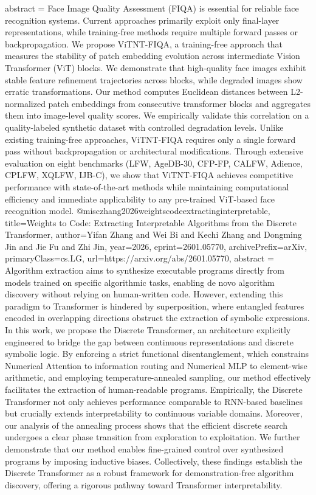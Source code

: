 {      abstract = {Face Image Quality Assessment (FIQA) is essential for reliable face recognition systems. Current approaches primarily exploit only final-layer representations, while training-free methods require multiple forward passes or backpropagation. We propose ViTNT-FIQA, a training-free approach that measures the stability of patch embedding evolution across intermediate Vision Transformer (ViT) blocks. We demonstrate that high-quality face images exhibit stable feature refinement trajectories across blocks, while degraded images show erratic transformations. Our method computes Euclidean distances between L2-normalized patch embeddings from consecutive transformer blocks and aggregates them into image-level quality scores. We empirically validate this correlation on a quality-labeled synthetic dataset with controlled degradation levels. Unlike existing training-free approaches, ViTNT-FIQA requires only a single forward pass without backpropagation or architectural modifications. Through extensive evaluation on eight benchmarks (LFW, AgeDB-30, CFP-FP, CALFW, Adience, CPLFW, XQLFW, IJB-C), we show that ViTNT-FIQA achieves competitive performance with state-of-the-art methods while maintaining computational efficiency and immediate applicability to any pre-trained ViT-based face recognition model.}
}@misc{zhang2026weightscodeextractinginterpretable,
      title={Weights to Code: Extracting Interpretable Algorithms from the Discrete Transformer}, 
      author={Yifan Zhang and Wei Bi and Kechi Zhang and Dongming Jin and Jie Fu and Zhi Jin},
      year={2026},
      eprint={2601.05770},
      archivePrefix={arXiv},
      primaryClass={cs.LG},
      url={https://arxiv.org/abs/2601.05770},
      abstract = {Algorithm extraction aims to synthesize executable programs directly from models trained on specific algorithmic tasks, enabling de novo algorithm discovery without relying on human-written code. However, extending this paradigm to Transformer is hindered by superposition, where entangled features encoded in overlapping directions obstruct the extraction of symbolic expressions. In this work, we propose the Discrete Transformer, an architecture explicitly engineered to bridge the gap between continuous representations and discrete symbolic logic. By enforcing a strict functional disentanglement, which constrains Numerical Attention to information routing and Numerical MLP to element-wise arithmetic, and employing temperature-annealed sampling, our method effectively facilitates the extraction of human-readable programs. Empirically, the Discrete Transformer not only achieves performance comparable to RNN-based baselines but crucially extends interpretability to continuous variable domains. Moreover, our analysis of the annealing process shows that the efficient discrete search undergoes a clear phase transition from exploration to exploitation. We further demonstrate that our method enables fine-grained control over synthesized programs by imposing inductive biases. Collectively, these findings establish the Discrete Transformer as a robust framework for demonstration-free algorithm discovery, offering a rigorous pathway toward Transformer interpretability.}
}
